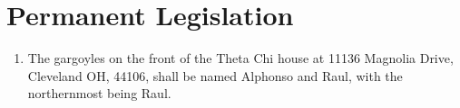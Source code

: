 \chapter{Permanent Legislation}

\begin{enumerate}
	\item The gargoyles on the front of the Theta Chi house at 11136 Magnolia Drive, Cleveland OH, 44106, shall be named Alphonso and Raul, with the northernmost being Raul.
\end{enumerate}